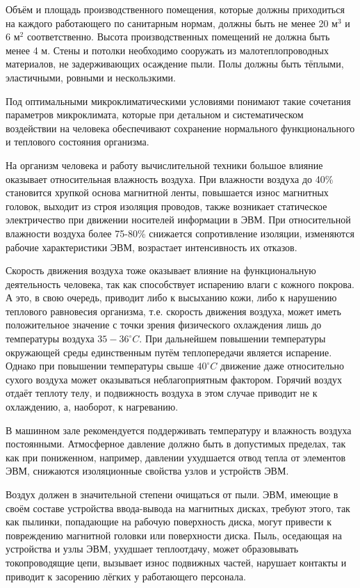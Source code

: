 Объём и площадь производственного помещения, которые должны приходиться на каждого работающего по санитарным нормам, должны быть не менее 20 $\text{м}^{3}$ и 6 $\text{м}^{2}$ соответственно. Высота производственных помещений не должна быть менее 4 м. Стены и потолки необходимо сооружать из малотеплопроводных материалов, не задерживающих осаждение пыли. Полы должны быть тёплыми, эластичными, ровными и нескользкими.

Под оптимальными микроклиматическими условиями понимают такие сочетания параметров микроклимата, которые при детальном и систематическом воздействии на человека обеспечивают сохранение нормального функционального и теплового состояния организма.

На организм человека и работу вычислительной техники большое влияние оказывает относительная влажность воздуха. При влажности воздуха до 40\% становится хрупкой основа магнитной ленты, повышается износ магнитных головок, выходит из строя изоляция проводов, также возникает статическое электричество при движении носителей информации в ЭВМ. При относительной влажности воздуха более 75-80\% снижается сопротивление изоляции, изменяются рабочие характеристики ЭВМ, возрастает интенсивность их отказов.

Скорость движения воздуха тоже оказывает влияние на функциональную деятельность человека, так как способствует испарению влаги с кожного покрова. А это, в свою очередь, приводит либо к высыханию кожи, либо к нарушению теплового равновесия организма, т.е. скорость движения воздуха, может иметь положительное значение с точки зрения физического охлаждения лишь до температуры воздуха $35-36^{\circ} C$. При дальнейшем повышении температуры окружающей среды единственным путём теплопередачи является испарение. Однако при повышении температуры свыше $40^{\circ} C$ движение даже относительно сухого воздуха может оказываться неблагоприятным фактором. Горячий воздух отдаёт теплоту телу, и подвижность воздуха в этом случае приводит не к охлаждению, а, наоборот, к нагреванию.

В машинном зале рекомендуется поддерживать температуру и влажность воздуха постоянными. Атмосферное давление должно быть в допустимых пределах, так как при пониженном, например, давлении ухудшается отвод тепла от элементов ЭВМ, снижаются изоляционные свойства узлов и устройств ЭВМ.

Воздух должен в значительной степени очищаться от пыли. ЭВМ, имеющие в своём составе устройства ввода-вывода на магнитных дисках, требуют этого, так как пылинки, попадающие на рабочую поверхность диска, могут привести к повреждению магнитной головки или поверхности диска. Пыль, оседающая на устройства и узлы ЭВМ, ухудшает теплоотдачу, может образовывать токопроводящие цепи, вызывает износ подвижных частей, нарушает контакты и приводит к засорению лёгких у работающего персонала.

